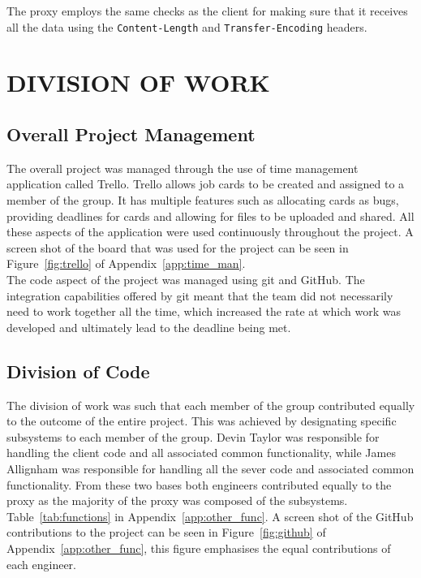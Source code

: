 \documentclass[10pt,twocolumn]{witseiepaper}
\begin{document}
	The proxy employs the same checks as the client for making sure that it receives all the data using the \texttt{Content-Length} and \texttt{Transfer-Encoding} headers.  

\section{DIVISION OF WORK}

	\subsection{Overall Project Management}
	
		The overall project was managed through the use of time management application called Trello. Trello allows job cards to be created and assigned to a member of the group. It has multiple features such as allocating cards as bugs, providing deadlines for cards and allowing for files to be uploaded and shared. All these aspects of the application were used continuously throughout the project. A screen shot of the board that was used for the project can be seen in Figure~\ref{fig:trello} of Appendix~\ref{app:time_man}. \\
		
		The code aspect of the project was managed using git and GitHub. The integration capabilities offered by git meant that the team did not necessarily need to work together all the time, which increased the rate at which work was developed and ultimately lead to the deadline being met. 

	\subsection{Division of Code}
	
		The division of work was such that each member of the group contributed equally to the outcome of the entire project. This was achieved by designating specific subsystems to each member of the group. Devin Taylor was responsible for handling the client code and all associated common functionality, while James Allignham was responsible for handling all the sever code and associated common functionality. From these two bases both engineers contributed equally to the proxy as the majority of the proxy was composed of the subsystems. Table~\ref{tab:functions} in Appendix~\ref{app:other_func}. A screen shot of the GitHub contributions to the project can be seen in Figure~\ref{fig:github} of Appendix~\ref{app:other_func}, this figure emphasises the equal contributions of each engineer. 
	
\end{document}
